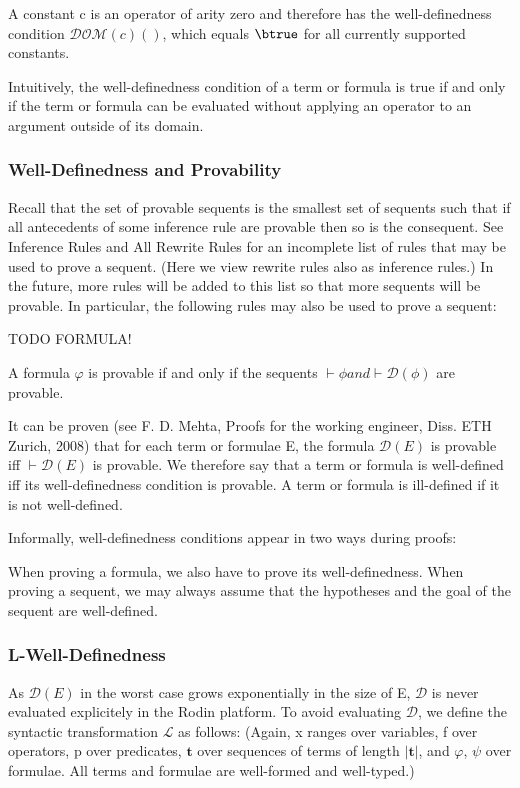 A constant c is an operator of arity zero and therefore has the well-definedness condition $\mathcal{DOM}(c)()$, which equals $\btrue$ for all currently supported constants.

Intuitively, the well-definedness condition of a term or formula is true if and only if the term or formula can be evaluated without applying an operator to an argument outside of its domain.

\subsubsection{Well-Definedness and Provability}

Recall that the set of provable sequents is the smallest set of sequents such that if all antecedents of some inference rule are provable then so is the consequent. See Inference Rules and All Rewrite Rules for an incomplete list of rules that may be used to prove a sequent. (Here we view rewrite rules also as inference rules.) In the future, more rules will be added to this list so that more sequents will be provable. In particular, the following rules may also be used to prove a sequent:

TODO FORMULA!

A formula $φ$ is provable if and only if the sequents $\vdash\phi and \vdash\mathcal{D}(\phi)$ are provable.

It can be proven (see F. D. Mehta, Proofs for the working engineer, Diss. ETH Zurich, 2008) that for each term or formulae E, the formula $\mathcal{D}(E)$ is provable iff $\vdash\mathcal{D}(E)$ is provable. We therefore say that a term or formula is well-defined iff its well-definedness condition is provable. A term or formula is ill-defined if it is not well-defined.

Informally, well-definedness conditions appear in two ways during proofs:

    When proving a formula, we also have to prove its well-definedness.
    When proving a sequent, we may always assume that the hypotheses and the goal of the sequent are well-defined. 

\subsubsection{L-Well-Definedness}

As $\mathcal{D}(E)$ in the worst case grows exponentially in the size of E, $\mathcal{D}$ is never evaluated explicitely in the Rodin platform. To avoid evaluating $\mathcal{D}$, we define the syntactic transformation $\mathcal{L}$ as follows:
(Again, x ranges over variables, f over operators, p over predicates, $\mathbf{t}$ over sequences of terms of length $|\mathbf{t}|$, and $φ$, $ψ$ over formulae. All terms and formulae are well-formed and well-typed.)

